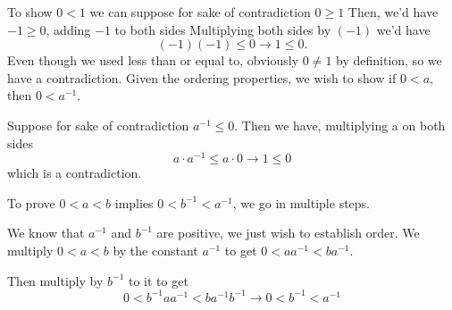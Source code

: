 \begin{example}[3.4]
To show $0 < 1$ we can suppose for sake of contradiction $0 \ge 1$
Then, we'd have $-1 \ge 0$, adding $-1$ to both sides
Multiplying both sides by $(-1)$ we'd have $$(-1)(-1) \le 0 \rightarrow 1 \le 0.$$
Even though we used less than or equal to, obviously $0 \ne 1$ by definition, so we have
a contradiction.
Given the ordering properties, we wish to show if $0 < a$, then $0 < a^{-1}.$
\par Suppose for sake of contradiction $a^{-1} \le 0.$ Then we have, multiplying a on both
sides $$a \cdot a^{-1} \le a \cdot 0 \rightarrow 1 \le 0$$ which is a contradiction.
\par To prove $0 < a < b$ implies $0 < b^{-1} < a^{-1}$, we go in multiple steps.
\par We know that $a^{-1}$ and $b^{-1}$ are positive, we just wish to establish order.
We multiply $0 < a < b$ by the constant $a^{-1}$ to get $0 < a a^{-1} < ba^{-1}.$
\par Then multiply by $b^{-1}$ to it to get $$0 < b^{-1} a a^{-1} < b a^{-1}b^{-1}
\rightarrow 0 < b^{-1} < a^{-1}$$
\end{example}
%





